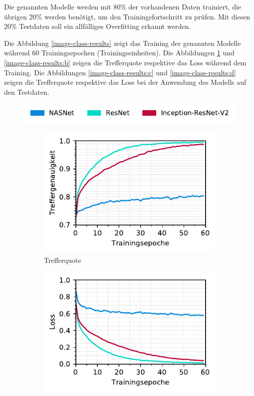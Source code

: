 Die genannten Modelle werden mit 80\% der vorhandenen Daten trainiert, die übrigen 20\% werden benötigt, um den Trainingsfortschritt zu prüfen. Mit diesen 20\% Testdaten soll ein allfälliges Overfitting erkannt werden.

Die Abbildung \ref{image-class-results} zeigt das Training der genannten Modelle während 60 Trainingsepochen (Trainingseinheiten). Die Abbildungen \ref{image-class-results:a} und \ref{image-class-results:b} zeigen die Trefferquote respektive das Loss während dem Training. Die Abbildungen \ref{image-class-results:c} und \ref{image-class-results:d} zeigen die Trefferquote respektive das Loss bei der Anwendung des Modells auf den Testdaten. 

\begin{figure}[h!] 
  \captionsetup{width=.9\linewidth}
  \caption{Statistiken aus dem Training der Bild-basierten Klassifizierung von Rechnungen}
  \label{image-class-results} 
  \includegraphics[scale=1]{graphics/matplot/img-class__legend.pdf}
  \begin{subfigure}[b]{0.5\linewidth}
    \centering
    \includegraphics[scale=1]{graphics/matplot/img-class__acc.pdf}
    \caption{Trefferquote} 
    \label{image-class-results:a} 
    \vspace{2ex}
  \end{subfigure}%
  \begin{subfigure}[b]{0.5\linewidth}
    \centering
    \includegraphics[scale=1]{graphics/matplot/img-class__loss.pdf}

\end{subfigure}
\end{figure}
